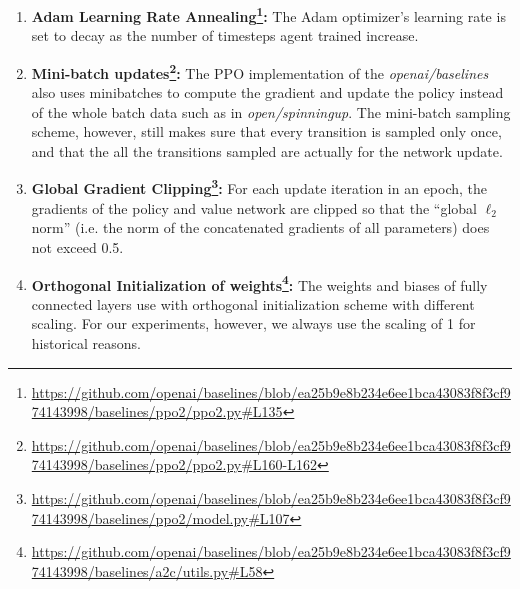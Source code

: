 \documentclass[letterpaper]{article}
\begin{document}
\begin{enumerate}
    \[V_{loss} =\max \left[\left(V_{\theta_{t}}-V_{t a r g}\right)^{2},\left(V_{\theta_{t-1}} + \mbox{clip}\left(V_{\theta_{t}}-V_{\theta_{t-1}}, -\varepsilon, \varepsilon\right)\right)^{2}\right]\]
    where $V_{t a r g}$ is calculated by adding $V_{\theta_{t-1}}$ and the  $A$ calculated by General Advantage Estimation\cite{schulman2015high}.
    \item \textbf{Adam Learning Rate Annealing\footnote{\url{https://github.com/openai/baselines/blob/ea25b9e8b234e6ee1bca43083f8f3cf974143998/baselines/ppo2/ppo2.py\#L135}}:} The Adam \cite{kingma2014adam} optimizer's learning rate is set to decay as the number of timesteps agent trained increase.
    \item \textbf{Mini-batch updates\footnote{\url{https://github.com/openai/baselines/blob/ea25b9e8b234e6ee1bca43083f8f3cf974143998/baselines/ppo2/ppo2.py\#L160-L162}}:} The PPO implementation of the {\em  openai/baselines} also uses minibatches to compute the gradient and update the policy instead of the whole batch data such as in {\em open/spinningup}.
    The mini-batch sampling scheme, however, still makes sure that every transition is sampled only once, and that the all the transitions sampled are actually for the network update.
    \item \textbf{Global Gradient Clipping\footnote{\url{https://github.com/openai/baselines/blob/ea25b9e8b234e6ee1bca43083f8f3cf974143998/baselines/ppo2/model.py\#L107}}:} For each update iteration in an epoch, the gradients of the policy and value network are clipped so that the ``global $\ell_{2}$ norm'' (i.e. the norm of the concatenated gradients of all parameters) does not exceed 0.5.
    \item \textbf{Orthogonal Initialization  of weights\footnote{\url{https://github.com/openai/baselines/blob/ea25b9e8b234e6ee1bca43083f8f3cf974143998/baselines/a2c/utils.py\#L58}}:} The weights and biases of fully connected layers use with orthogonal initialization scheme with different scaling. For our experiments, however, we always use the scaling of 1 for historical reasons.
\end{enumerate}
\end{document}
